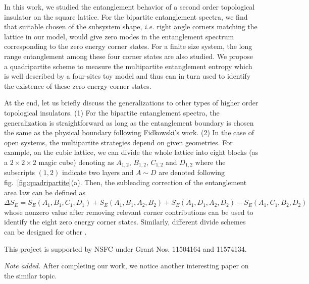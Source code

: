 \documentclass[doublecol]{epl2} %
\newcommand{\ie}{\textit{i.e.{ }}}
\begin{document}
In this work, we studied the entanglement behavior of a second order topological insulator on the square lattice. For the bipartite entanglement spectra, we find that suitable chosen of the subsystem shape, \ie right angle corners matching the lattice in our model, would give zero modes in the entanglement spectrum corresponding to the zero energy corner states. For a finite size system, the long range entanglement among these four corner states are also studied. We propose a quadripartite scheme to measure the multipartite entanglement entropy which is well described by a four-sites toy model and thus can in turn used to identify the existence of these zero energy corner states. 

At the end, let us briefly discuss the generalizations to other types of higher order topological insulators. (1) For the bipartite entanglement spectra, the generalization is straightforward as long as the entanglement boundary is chosen the same as the physical boundary following Fidkowski's work. \cite{Fidkowski_PRL_2010} (2) In the case of open systems, the multipartite strategies depend on given geometries. For example, on the cubic lattice, we can divide the whole lattice into eight blocks (as a $2\times2\times2$ magic cube) denoting as $A_{1,2}$, $B_{1,2}$, $C_{1,2}$ and $D_{1,2}$ where the subscripts $(1,2)$ indicate two layers and $A\sim D$ are denoted following fig.~\ref{fig:quadripartite}(a). Then, the subleading correction of the entanglement area law can be defined as $\Delta S_E= S_E(A_1,B_1,C_1,D_1)+S_E(A_1,B_1,A_2,B_2)+S_E(A_1,D_1,A_2,D_2)-S_E(A_1,C_1,B_2,D_2)$ whose nonzero value after removing relevant corner contributions can be used to identify the eight zero energy corner states. Similarly, different divide schemes can be designed for other . 


\acknowledgments
This project is supported by NSFC under Grant Nos. 11504164 and 11574134.

{\it Note added.} After completing our work, we notice another interesting paper \cite{Fukui_PRB_2018} on the similar topic.

%
%
%
%


\end{document}
